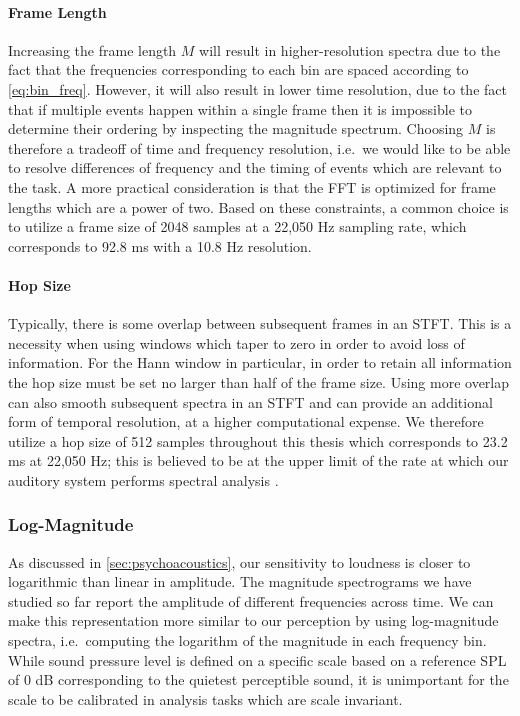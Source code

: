 \paragraph{Frame Length}

Increasing the frame length $M$ will result in higher-resolution spectra due to the fact that the frequencies corresponding to each bin are spaced according to \cref{eq:bin_freq}.
However, it will also result in lower time resolution, due to the fact that if multiple events happen within a single frame then it is impossible to determine their ordering by inspecting the magnitude spectrum.
Choosing $M$ is therefore a tradeoff of time and frequency resolution, i.e.\ we would like to be able to resolve differences of frequency and the timing of events which are relevant to the task.
A more practical consideration is that the FFT is optimized for frame lengths which are a power of two.
Based on these constraints, a common choice is to utilize a frame size of 2048 samples at a 22,050 Hz sampling rate, which corresponds to 92.8 ms with a 10.8 Hz resolution.

\paragraph{Hop Size}

Typically, there is some overlap between subsequent frames in an STFT.
This is a necessity when using windows which taper to zero in order to avoid loss of information.
For the Hann window in particular, in order to retain all information the hop size must be set no larger than half of the frame size.
Using more overlap can also smooth subsequent spectra in an STFT and can provide an additional form of temporal resolution, at a higher computational expense.
We therefore utilize a hop size of 512 samples throughout this thesis which corresponds to 23.2 ms at 22,050 Hz; this is believed to be at the upper limit of the rate at which our auditory system performs spectral analysis \cite{}.

\subsubsection{Log-Magnitude}

As discussed in \cref{sec:psychoacoustics}, our sensitivity to loudness is closer to logarithmic than linear in amplitude.
The magnitude spectrograms we have studied so far report the amplitude of different frequencies across time.
We can make this representation more similar to our perception by using log-magnitude spectra, i.e.\ computing the logarithm of the magnitude in each frequency bin.
While sound pressure level is defined on a specific scale based on a reference SPL of 0 dB corresponding to the quietest perceptible sound, it is unimportant for the scale to be calibrated in analysis tasks which are scale invariant.

